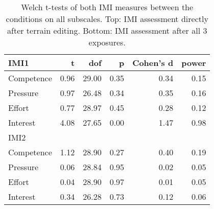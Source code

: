 \begin{table}[b!]
    \centering
    \caption{Welch t-tests of both IMI measures between the conditions on all subscales. Top: IMI assessment directly after terrain editing. Bottom: IMI assessment after all 3 exposures.}
    \begin{tabular}{lrrrrr}

    \toprule
        IMI1    &     t &    dof &     p &  Cohen's d &  power \\
    \midrule
     Competence &  0.96 &  29.00 &  0.35 &       0.34 &   0.15 \\
       Pressure & \text{-}0.97 &  26.48 &  0.34 &       0.35 &   0.16 \\
         Effort &  0.77 &  28.97 &  0.45 &       0.28 &   0.12 \\
       Interest &  4.08 &  27.65 &  0.00 &       1.47 &   0.98 \\
    \toprule
        IMI2    &       &        &       &            &        \\
    \midrule
     Competence & \text{-}1.12 &  28.90 &  0.27 &       0.40 &   0.19 \\
       Pressure &  0.06 &  28.84 &  0.95 &       0.02 &   0.05 \\
         Effort &  0.04 &  28.90 &  0.97 &       0.01 &   0.05 \\
       Interest &  0.34 &  26.28 &  0.73 &       0.12 &   0.06 \\
    \bottomrule
    \end{tabular}
    \label{tab:imi_ttests}
\end{table}